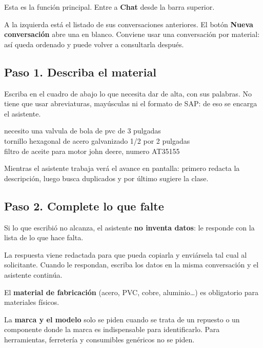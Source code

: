 Esta es la función principal. Entre a \textbf{Chat} desde la barra superior.


A la izquierda está el listado de sus conversaciones anteriores. El botón
\textbf{Nueva conversación} abre una en blanco. Conviene usar una conversación
por material: así queda ordenado y puede volver a consultarla después.

\subsection{Paso 1. Describa el material}

Escriba en el cuadro de abajo lo que necesita dar de alta, con sus palabras. No
tiene que usar abreviaturas, mayúsculas ni el formato de SAP: de eso se encarga
el asistente.

\begin{nota}
\ttfamily
necesito una valvula de bola de pvc de 3 pulgadas\\[3pt]
tornillo hexagonal de acero galvanizado 1/2 por 2 pulgadas\\[3pt]
filtro de aceite para motor john deere, numero AT35155
\end{nota}

Mientras el asistente trabaja verá el avance en pantalla: primero redacta la
descripción, luego busca duplicados y por último sugiere la clase.


\subsection{Paso 2. Complete lo que falte}

Si lo que escribió no alcanza, el asistente \textbf{no inventa datos}: le
responde con la lista de lo que hace falta.


La respuesta viene redactada para que pueda copiarla y enviársela tal cual al
solicitante. Cuando le respondan, escriba los datos en la misma conversación y
el asistente continúa.

\begin{nota}
El \textbf{material de fabricación} (acero, PVC, cobre, aluminio\ldots) es
obligatorio para materiales físicos.

La \textbf{marca y el modelo} solo se piden cuando se trata de un repuesto o un
componente donde la marca es indispensable para identificarlo. Para
herramientas, ferretería y consumibles genéricos no se piden.
\end{nota}

